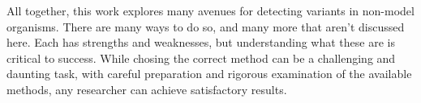 All together, this work explores many avenues for detecting variants in non-model organisms. 
There are many ways to do so, and many more that aren't discussed here.
Each has strengths and weaknesses, but understanding what these are is critical to success.
While chosing the correct method can be a challenging and daunting task, with careful preparation and rigorous examination of the available methods, any researcher can achieve satisfactory results.

\printbibliography[segment=\therefsegment]{}
